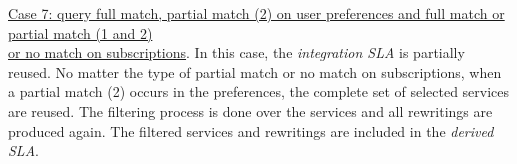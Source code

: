 \documentclass[10pt,a4paper,final]{report}
\begin{document}
\noindent \underline{Case 7: query full match, partial match (2) on user preferences and full match or partial match (1 and 2)} \\ \underline{or no match on subscriptions}. In this case, the \textsl{integration SLA} is partially reused.  No matter the type of partial match or no match on subscriptions, when a partial match (2) occurs in the preferences, the complete set of selected services are reused. The filtering process is done over the services and all rewritings are produced again. The filtered services and rewritings are included in the \textsl{derived SLA}.
\end{document}
